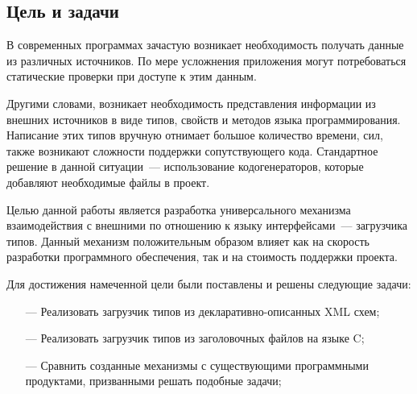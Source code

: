 \subsection{Цель и задачи}

В современных программах зачастую возникает необходимость получать данные из различных источников.
По мере усложнения приложения могут потребоваться статические проверки при доступе к этим данным.

Другими словами, возникает необходимость представления информации из внешних источников в виде типов, свойств и методов языка программирования.
Написание этих типов вручную отнимает большое количество времени, сил, также возникают сложности поддержки сопутствующего кода.
Стандартное решение в данной ситуации~--- использование кодогенераторов, которые добавляют необходимые файлы в проект.

Целью данной работы является разработка универсального механизма взаимодействия с внешними по отношению к языку интерфейсами~--- загрузчика типов. Данный механизм положительным образом влияет как на скорость разработки программного обеспечения, так и на стоимость поддержки проекта.

Для достижения намеченной цели были поставлены и решены следующие задачи:
\begin{itemize}
\item[---] Реализовать загрузчик типов из декларативно-описанных XML схем;
\item[---] Реализовать загрузчик типов из заголовочных файлов на языке C;
\item[---] Сравнить созданные механизмы с существующими программными продуктами, призванными решать подобные задачи;
\end{itemize}